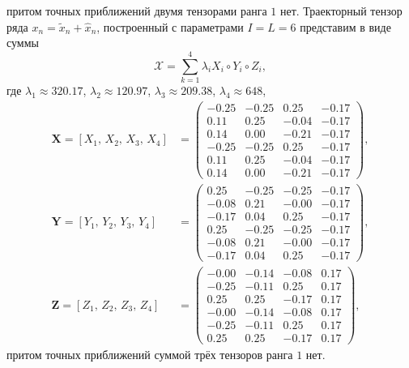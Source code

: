 \documentclass[specialist,
    substylefile = spbu.rtx,
    subf,href,colorlinks=true, 12pt]{disser}
\theoremstyle{plain}
\theoremstyle{definition}
\theoremstyle{remark}
\begin{document}
    притом точных приближений двумя тензорами ранга $1$ нет.
    Траекторный тензор ряда $x_n=\tilde{x}_n+\hat{x}_n$, построенный с параметрами $I=L=6$ представим в виде суммы
    \[
        \mathcal{X}=\sum_{k=1}^{4}\lambda_i X_i \circ Y_i\circ Z_i,
    \]
    где $\lambda_1 \approx 320.17$, $\lambda_2 \approx 120.97$, $\lambda_3 \approx 209.38$, $\lambda_4 \approx 648$,
    \begin{align*}
        \mathbf{X}=[X_1,\, X_2,\, X_3,\, X_4] &=
        \begin{pmatrix}
            -0.25 & -0.25 & 0.25  & -0.17 \\
            0.11  & 0.25  & -0.04 & -0.17 \\
            0.14  & 0.00  & -0.21 & -0.17 \\
            -0.25 & -0.25 & 0.25  & -0.17 \\
            0.11  & 0.25  & -0.04 & -0.17 \\
            0.14  & 0.00  & -0.21 & -0.17
        \end{pmatrix},\\
        \mathbf{Y}=[Y_1,\, Y_2,\, Y_3,\, Y_4] &=
        \begin{pmatrix}
            0.25  & -0.25 & -0.25 & -0.17 \\
            -0.08 & 0.21  & -0.00 & -0.17 \\
            -0.17 & 0.04  & 0.25  & -0.17 \\
            0.25  & -0.25 & -0.25 & -0.17 \\
            -0.08 & 0.21  & -0.00 & -0.17 \\
            -0.17 & 0.04  & 0.25  & -0.17
        \end{pmatrix},\\
        \mathbf{Z}=[Z_1,\, Z_2,\, Z_3,\, Z_4] &=
        \begin{pmatrix}
            -0.00 & -0.14 & -0.08 & 0.17 \\
            -0.25 & -0.11 & 0.25  & 0.17 \\
            0.25  & 0.25  & -0.17 & 0.17 \\
            -0.00 & -0.14 & -0.08 & 0.17 \\
            -0.25 & -0.11 & 0.25  & 0.17 \\
            0.25  & 0.25  & -0.17 & 0.17
        \end{pmatrix},
    \end{align*}
    притом точных приближений суммой трёх тензоров ранга $1$ нет.
\end{document}
